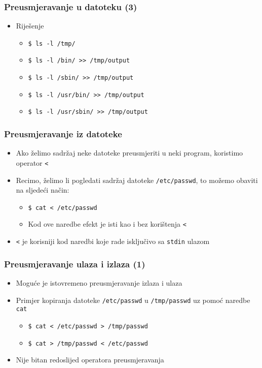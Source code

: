 \documentclass{beamer}
\newcommand{\shell}[1]{\texttt{#1}}
\begin{document}
\begin{frame}[t]
\frametitle{Preusmjeravanje u datoteku (3)}
\begin{itemize}
	\item Riješenje
	\begin{itemize}

	\item[] \shell{\$ ls -l /tmp/}
	\item[] \shell{\$ ls -l /bin/ >> /tmp/output}
	\item[] \shell{\$ ls -l /sbin/ >> /tmp/output}
	\item[] \shell{\$ ls -l /usr/bin/ >> /tmp/output}
	\item[] \shell{\$ ls -l /usr/sbin/ >> /tmp/output}

	\end{itemize}
\end{itemize}
\end{frame}


\begin{frame}[t]
\frametitle{Preusmjeravanje iz datoteke}
\begin{itemize}
  \item Ako želimo sadržaj neke datoteke preusmjeriti u neki program,
        koristimo operator \shell{<}
  \item Recimo, želimo li pogledati sadržaj datoteke \shell{/etc/passwd},
        to možemo obaviti na sljedeći način:
  \begin{itemize}
    \item[] \shell{\$ cat < /etc/passwd}
    \item[] {\small Kod ove naredbe efekt je isti kao i bez korištenja \shell{<}}
  \end{itemize}
	\item \shell{<} je korisniji kod naredbi koje rade isključivo sa \shell{stdin} ulazom
\end{itemize}
\end{frame}

\begin{frame}[t]
\frametitle{Preusmjeravanje ulaza i izlaza (1)}
\begin{itemize}
  \item Moguće je istovremeno preusmjeravanje izlaza i ulaza
  \item Primjer kopiranja datoteke \shell{/etc/passwd} u
        \shell{/tmp/passwd} uz pomoć naredbe \shell{cat}
  \begin{itemize}
    \item[] \shell{\$ cat < /etc/passwd > /tmp/passwd}
    \item[] \shell{\$ cat > /tmp/passwd < /etc/passwd}
  \end{itemize}
  \item Nije bitan redoslijed operatora preusmjeravanja
\end{itemize}
\end{frame}
\end{document}

